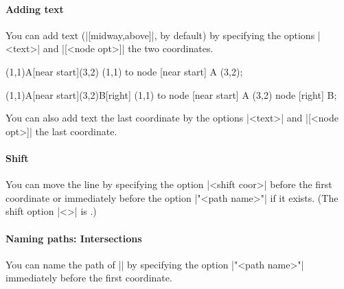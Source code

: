 \paragraph{Adding text}

You can add text  (|[midway,above]|, by default) by specifying the options |{<text>}| and |[<node opt>]|  the two coordinates.

\begin{tztikz}
(1,1){A}[near start](3,2) %
   (1,1) to node [near start] {A} (3,2);

(1,1){A}[near start](3,2){B}[right] %
   (1,1) to node [near start] {A} 
                        (3,2)    node [right]      {B};
\end{tztikz}


You can also add text  the last coordinate by the options |{<text>}| and |[<node opt>]|  the last coordinate.

\begin{tzcode}{.3}
\end{tzcode}

\paragraph{Shift}
You can move the line by specifying the option |<shift coor>| before the first coordinate or immediately before the option |"<path name>"| if it exists.
(The  shift option |<>| is .)

\begin{tzcode}{.3}
\end{tzcode}

\paragraph{Naming paths: Intersections}
You can name the path of |\tzto| by specifying the option |"<path name>"| immediately before the first coordinate.

